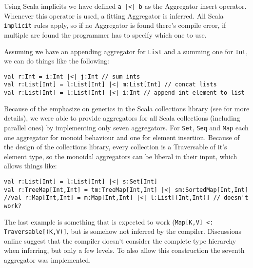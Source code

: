 \documentclass[10pt,a4paper]{article}
\begin{document}
Using Scala implicits we have defined \lstinline!a |<| b! as the Aggregator insert operator. Whenever this operator is used, a fitting Aggregator is inferred. All Scala \lstinline|implicit| rules apply, so if no Aggregator is found there's compile error, if multiple are found the programmer has to specify which one to use.

Assuming we have an appending aggregator for \lstinline|List| and a summing one for \lstinline|Int|, we can do things like the following:
\begin{lstlisting}
val r:Int = i:Int |<| j:Int // sum ints
val r:List[Int] = l:List[Int] |<| m:List[Int] // concat lists
val r:List[Int] = l:List[Int] |<| i:Int // append int element to list
\end{lstlisting}

Because of the emphasize on generics in the Scala collections library (see \citep{odersky2009fighting} for more details), we were able to provide aggregators for all Scala collections (including parallel ones) by implementing only seven aggregators. For \lstinline|Set|, \lstinline|Seq| and \lstinline|Map| each one aggregator for monoid behaviour and one for element insertion. Because of the design of the collections library, every collection is a Traversable of it's element type, so the monoidal aggregators can be liberal in their input, which allows things like:
\begin{lstlisting}
val r:List[Int] = l:List[Int] |<| s:Set[Int]
val r:TreeMap[Int,Int] = tm:TreeMap[Int,Int] |<| sm:SortedMap[Int,Int]
//val r:Map[Int,Int] = m:Map[Int,Int] |<| l:List[(Int,Int)] // doesn't work?
\end{lstlisting}
The last example is something that is expected to work (\lstinline|Map[K,V] <: Traversable[(K,V)]|, but is somehow not inferred by the compiler. Discussions online suggest that the compiler doesn't consider the complete type hierarchy when inferring, but only a few levels. To also allow this construction the seventh aggregator was implemented.
\end{document}
